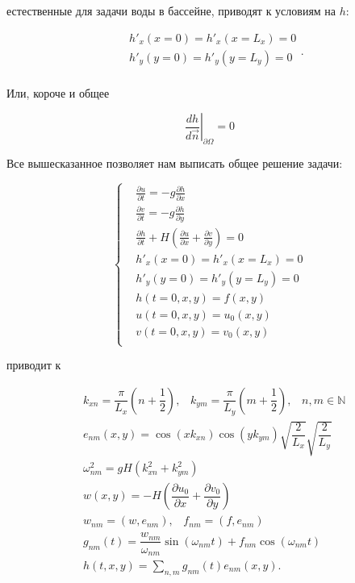 \documentclass[a4paper,12pt]{article} %
\begin{document}
естественные для задачи воды в бассейне, приводят к условиям на $h$:

\begin{equation}
\begin{aligned}
& h'_x(x = 0) = h'_x(x = L_x) = 0 \\
& h'_y(y = 0) = h'_y(y = L_y) = 0 \\
\end{aligned}.
\end{equation}

Или, короче и общее

\begin{equation}
\left. \dfrac{dh}{d \vec{n}} \right|_{\partial \Omega} = 0
\end{equation}

Все вышесказанное позволяет нам выписать общее решение задачи:

\begin{equation}
\begin{cases}
&\frac{\partial u}{\partial t}=-g \frac{\partial h}{\partial x}\\
&\frac{\partial v}{\partial t}=-g \frac{\partial h}{\partial y}\\
&\frac{\partial h}{\partial t}+H\left(\frac{\partial u}{\partial x}+\frac{\partial v}{\partial y}\right)=0 \\
& h'_x(x = 0) = h'_x(x = L_x) = 0 \\
& h'_y(y = 0) = h'_y(y = L_y) = 0 \\
& h(t = 0, x, y) = f(x, y) \\
& u(t = 0, x, y) = u_0(x, y) \\
& v(t = 0, x, y) = v_0(x, y) \\
\end{cases}
\end{equation}

приводит к

\begin{equation}
\begin{aligned}
& k_{xn} = \dfrac{\pi}{L_x} \left( n + \dfrac{1}{2} \right), \hspace{10pt} k_{ym} = \dfrac{\pi}{L_y} \left( m + \dfrac{1}{2} \right), \hspace{10pt} n,m \in \mathbb{N} \\
& e_{nm}(x,y) = \cos{(x k_{xn})} \cos{(y k_{ym})} \sqrt{\dfrac{2}{L_x}} \sqrt{\dfrac{2}{L_y}} \\
& \omega_{nm}^2 = g H (k_{xn}^2 + k_{ym}^2) \\
& w(x,y) = -H \left( \dfrac{\partial u_0}{\partial x} + \dfrac{\partial v_0}{\partial y} \right) \\
& w_{nm} = (w, e_{nm}), \hspace{10pt} f_{nm} = (f, e_{nm}) \\
& g_{nm}(t) = \dfrac{w_{nm}}{\omega_{nm}} \sin{(\omega_{nm} t)} + f_{nm} \cos{(\omega_{nm} t)} \\
& h(t, x, y) = \sum_{n, m} g_{nm}(t) e_{nm}(x,y). \\
\end{aligned}
\end{equation}
\end{document}
